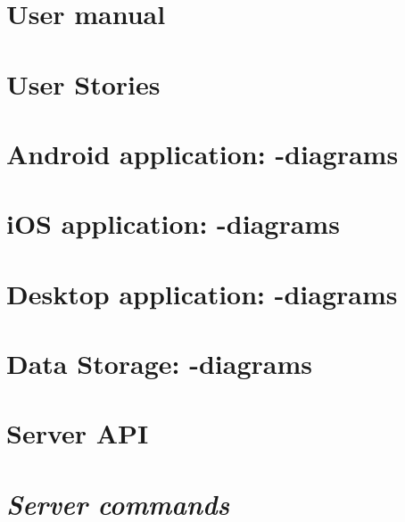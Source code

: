 \begin{appendix}

\chapter{User manual}


\chapter{User Stories}

\newpage
\chapter{Android application: -diagrams}


\chapter{iOS application: -diagrams}
\label{chap:ios_appendix}


\chapter{Desktop application: -diagrams}
\label{chap:des_appendix}


\chapter{Data Storage: -diagrams}
\label{chap:dat_umls}


\chapter{Server API}


\chapter{\textit{Server commands}}

\begin{comment}
%


\end{comment}
\end{appendix}
